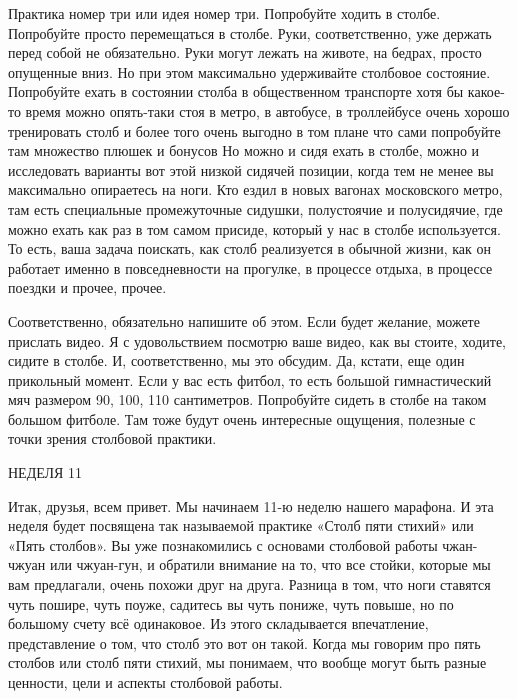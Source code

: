 Практика номер три или идея номер три. Попробуйте ходить в столбе. Попробуйте просто
перемещаться в столбе. Руки, соответственно, уже держать перед собой не обязательно. Руки могут лежать на животе,
на бедрах, просто опущенные вниз. Но при этом максимально удерживайте столбовое состояние. Попробуйте ехать в
состоянии столба в общественном транспорте хотя бы какое-то время можно опять-таки стоя в метро, в автобусе, в
троллейбусе очень хорошо тренировать столб и более того очень выгодно в том плане что сами попробуйте там
множество плюшек и бонусов Но можно и сидя ехать в столбе, можно и исследовать варианты вот этой низкой сидячей
позиции, когда тем не менее вы максимально опираетесь на ноги. Кто ездил в новых вагонах московского метро, там
есть специальные промежуточные сидушки, полустоячие и полусидячие, где можно ехать как раз в том самом присиде,
который у нас в столбе используется. То есть, ваша задача поискать, как столб реализуется в обычной жизни, как он
работает именно в повседневности на прогулке, в процессе отдыха, в процессе поездки и прочее, прочее.

Соответственно, обязательно напишите об этом. Если будет желание, можете прислать видео.
Я с удовольствием
посмотрю ваше видео, как вы стоите, ходите, сидите в столбе. И, соответственно, мы это обсудим. Да,
кстати, еще один
прикольный момент. Если у вас есть фитбол, то есть большой гимнастический мяч размером 90, 100, 110
сантиметров.
Попробуйте сидеть в столбе на таком большом фитболе. Там тоже будут очень интересные
ощущения, полезные с точки зрения столбовой практики.

\bigskip

\titleX НЕДЕЛЯ 11

Итак, друзья, всем привет. Мы начинаем
11-ю неделю нашего марафона.
И эта неделя будет посвящена так
называемой практике «Столб пяти стихий»
или «Пять столбов». Вы уже
познакомились с основами столбовой работы чжан-чжуан
или чжуан-гун, и обратили внимание
на то, что все стойки, которые мы вам предлагали, очень похожи
друг на друга. Разница в
том, что ноги ставятся чуть пошире, чуть поуже,
садитесь вы чуть пониже, чуть повыше, но по большому
счету всё одинаковое. Из этого складывается впечатление, представление о том,
что столб это вот он такой.
Когда мы говорим
про пять столбов или столб пяти стихий,
мы понимаем, что вообще могут быть разные
ценности, цели и аспекты
столбовой работы.


